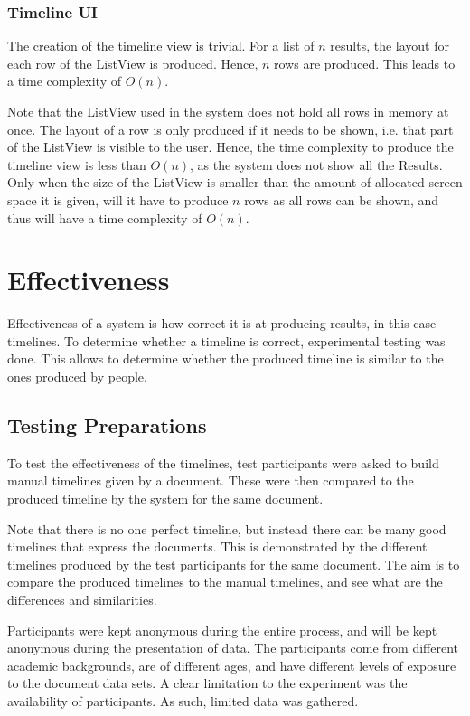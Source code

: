 \subsubsection{Timeline UI}
\par The creation of the timeline view is trivial. For a list of $n$ results, the layout for each row of the ListView is produced. Hence, $n$ rows are produced. This leads to a time complexity of $O(n)$.

\par Note that the ListView used in the system does not hold all rows in memory at once. The layout of a row is only produced if it needs to be shown, i.e. that part of the ListView is visible to the user. Hence, the time complexity to produce the timeline view is less than $O(n)$, as the system does not show all the Results. Only when the size of the ListView is smaller than the amount of allocated screen space it is given, will it have to produce $n$ rows as all rows can be shown, and thus will have a time complexity of $O(n)$.

\section{Effectiveness}

\par Effectiveness of a system is how correct it is at producing results, in this case timelines. To determine whether a timeline is correct, experimental testing was done. This allows to determine whether the produced timeline is similar to the ones produced by people.

\subsection{Testing Preparations}
\par To test the effectiveness of the timelines, test participants were asked to build manual timelines given by a document. These were then compared to the produced timeline by the system for the same document.

\par Note that there is no one perfect timeline, but instead there can be many good timelines that express the documents. This is demonstrated by the different timelines produced by the test participants for the same document.  The aim is to compare the produced timelines to the manual timelines, and see what are the differences and similarities.

\par Participants were kept anonymous during the entire process, and will be kept anonymous during the presentation of data. The participants come from different academic backgrounds, are of different ages, and have different levels of exposure to the document data sets. A clear limitation to the experiment was the availability of participants. As such, limited data was gathered.
 
